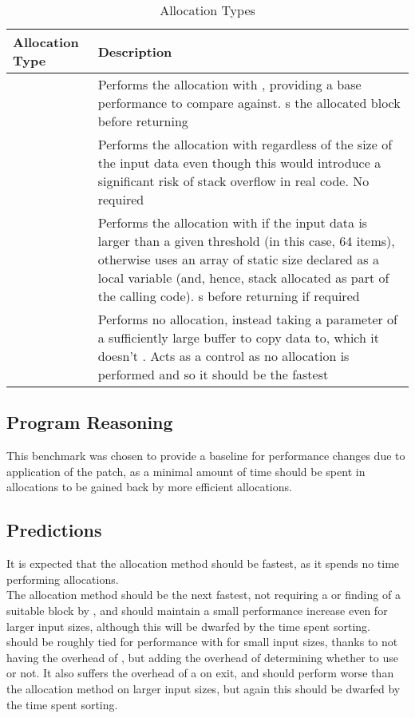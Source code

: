 \begin{table}
	\centering
	\begin{tabularx}{\linewidth}{>{\hsize=0.6\hsize}X >{\hsize=1.4\hsize}X}
		\toprule
		\textbf{Allocation Type} & \textbf{Description} \\
		\midrule
		\functionname{malloc} & Performs the allocation with \malloc{}, providing a base performance to compare against. \free{}s the allocated block before returning \\
		\functionname{stack} & Performs the allocation with \functionname{alloca} regardless of the size of the input data even though this would introduce a significant risk of stack overflow in real code. No \free{} required \\
		\functionname{dynamic} & Performs the allocation with \malloc{} if the input data is larger than a given threshold (in this case, 64 items), otherwise uses an array of static size declared as a local variable (and, hence, stack allocated as part of the calling code). \free{}s before returning if required \\
		\functionname{external} & Performs no allocation, instead taking a parameter of a sufficiently large buffer to copy data to, which it doesn't \free{}. Acts as a control as no allocation is performed and so it should be the fastest \\
		\bottomrule
	\end{tabularx}
	\caption{Allocation Types}\label{alloctype}
\end{table}

\subsection{Program Reasoning}

This benchmark was chosen to provide a baseline for performance changes due to application of the patch, as a minimal amount of time should be spent in allocations to be gained back by more efficient allocations.

\subsection{Predictions}

It is expected that the  allocation method should be fastest, as it spends no time performing allocations. \\
The  allocation method should be the next fastest, not requiring a \free{} or finding of a suitable block by \malloc{}, and should maintain a small performance increase even for larger input sizes, although this will be dwarfed by the time spent sorting. \\
 should be roughly tied for performance with  for small input sizes, thanks to not having the overhead of , but adding the overhead of determining whether to use \malloc{} or not. It also suffers the overhead of a \free{} on exit, and should perform worse than the  allocation method on larger input sizes, but again this should be dwarfed by the time spent sorting.

